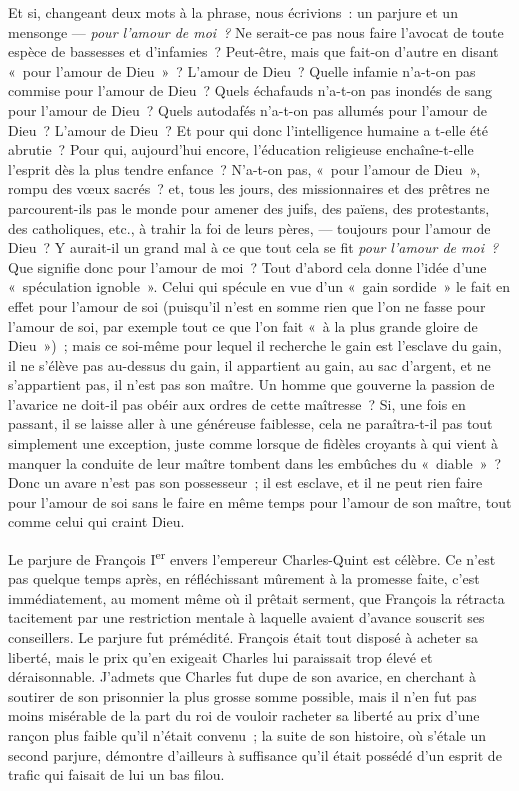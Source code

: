 \documentclass[french,twoside]{book} %
\begin{document}
Et si, changeant deux mots à la phrase, nous écrivions : un parjure et un mensonge — \emph{pour l’amour de moi ?} Ne serait-ce pas nous faire l’avocat de toute espèce de bassesses et d’infamies ? Peut-être, mais que fait-on d’autre en disant « pour l’amour de Dieu » ? L’amour de Dieu ? Quelle infamie n’a-t-on pas commise pour l’amour de Dieu ? Quels échafauds n’a-t-on pas inondés de sang pour l’amour de Dieu ? Quels autodafés n’a-t-on pas allumés pour l’amour de Dieu ? L’amour de Dieu ? Et pour qui donc l’intelligence humaine a t-elle été abrutie ? Pour qui, aujourd’hui encore, l’éducation religieuse enchaîne-t-elle l’esprit dès la plus tendre enfance ? N’a-t-on pas, « pour l’amour de Dieu », rompu des vœux sacrés ? et, tous les jours, des missionnaires et des prêtres ne parcourent-ils pas le monde pour amener des juifs, des païens, des protestants, des catholiques,  etc., à trahir la foi de leurs pères, — toujours pour l’amour de Dieu ? Y aurait-il un grand mal à ce que tout cela se fit \emph{pour l’amour de moi ?} Que signifie donc pour l’amour de moi ? Tout d’abord cela donne l’idée d’une « spéculation ignoble ». Celui qui spécule en vue d’un « gain sordide » le fait en effet pour l’amour de soi (puisqu’il n’est en somme rien que l’on ne fasse pour l’amour de soi, par exemple tout ce que l’on fait « à la plus grande gloire de Dieu ») ; mais ce soi-même pour lequel il recherche le gain est l’esclave du gain, il ne s’élève pas au-dessus du gain, il appartient au gain, au sac d’argent, et ne s’appartient pas, il n’est pas son maître. Un homme que gouverne la passion de l’avarice ne doit-il pas obéir aux ordres de cette maîtresse ? Si, une fois en passant, il se laisse aller à une généreuse faiblesse, cela ne paraîtra-t-il pas tout simplement une exception, juste comme lorsque de fidèles croyants à qui vient à manquer la conduite de leur maître tombent dans les embûches du « diable » ? Donc un avare n’est pas son possesseur ; il est esclave, et il ne peut rien faire pour l’amour de soi sans le faire en même temps pour l’amour de son maître, tout comme celui qui craint Dieu.\par
Le parjure de François I\textsuperscript{er} envers l’empereur Charles-Quint est célèbre. Ce n’est pas quelque temps après, en réfléchissant mûrement à la promesse faite, c’est immédiatement, au moment même où il prêtait serment, que François la rétracta tacitement par une restriction mentale à laquelle avaient d’avance souscrit ses conseillers. Le parjure fut prémédité. François était tout disposé à acheter sa liberté, mais le prix qu’en exigeait Charles lui paraissait trop élevé et déraisonnable. J’admets que Charles fut dupe de son avarice, en cherchant à soutirer de son prisonnier la plus grosse somme possible, mais il n’en fut pas moins misérable de la part du roi de vouloir racheter sa liberté au prix d’une rançon plus  faible qu’il n’était convenu ; la suite de son histoire, où s’étale un second parjure, démontre d’ailleurs à suffisance qu’il était possédé d’un esprit de trafic qui faisait de lui un bas filou.\par
\end{document}
